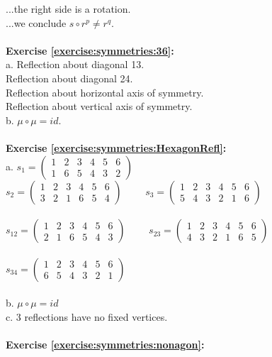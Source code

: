 ...the right side is a rotation.\\
...we conclude $s\circ r^p\neq r^q$.\\
\\
\textbf{Exercise \ref{exercise:symmetries:36}:}\\
a. Reflection about diagonal 13.\\
Reflection about diagonal 24.\\
Reflection about horizontal axis of symmetry.\\
Reflection about vertical axis of symmetry.\\
b. $\mu\circ \mu = id$.\\
\\
\textbf{Exercise \ref{exercise:symmetries:HexagonRefl}:}\\
a. $s_1=\begin{pmatrix}
1 & 2 & 3 & 4 & 5 & 6\\
1 & 6 & 5 & 4 & 3 & 2
\end{pmatrix}$
\\
$s_2=\begin{pmatrix}
1 & 2 & 3 & 4 & 5 & 6\\
3 & 2 & 1 & 6 & 5 & 4
\end{pmatrix}$
$\qquad s_3=\begin{pmatrix}
1 & 2 & 3 & 4 & 5 & 6\\
5 & 4 & 3 & 2 & 1 & 6
\end{pmatrix}$\\
\\
$s_{12}=\begin{pmatrix}
1 & 2 & 3 & 4 & 5 & 6\\
2 & 1 & 6 & 5 & 4 & 3
\end{pmatrix}$
$\qquad s_{23}=\begin{pmatrix}
1 & 2 & 3 & 4 & 5 & 6\\
4 & 3 & 2 & 1 & 6 & 5
\end{pmatrix}$\\
\\
$s_{34}=\begin{pmatrix}
1 & 2 & 3 & 4 & 5 & 6\\
6 & 5 & 4 & 3 & 2 & 1
\end{pmatrix}$\\
\\
b. $\mu\circ\mu=id$\\
c. 3 reflections have no fixed vertices.\\
\\
\textbf{Exercise \ref{exercise:symmetries:nonagon}:}\\
